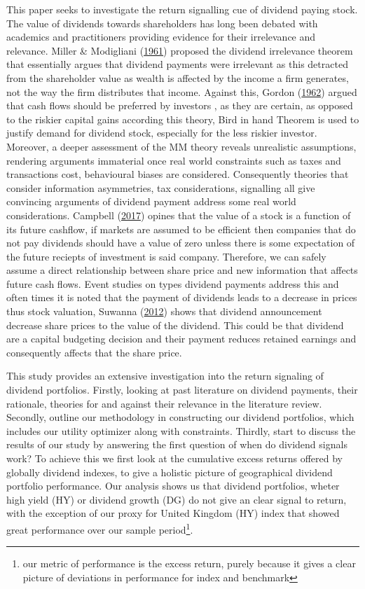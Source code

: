\documentclass[10pt,preprint, authoryear]{elsarticle}
\numberwithin{equation}{section}
\numberwithin{figure}{section}
\numberwithin{table}{section}
\let\rmarkdownfootnote\footnote%
\def\footnote{\protect\rmarkdownfootnote}
\begin{document}
This paper seeks to investigate the return signalling cue of dividend
paying stock. The value of dividends towards shareholders has long been
debated with academics and practitioners providing evidence for their
irrelevance and relevance. Miller \& Modigliani
(\protect\hyperlink{ref-miller}{1961}) proposed the dividend irrelevance
theorem that essentially argues that dividend payments were irrelevant
as this detracted from the shareholder value as wealth is affected by
the income a firm generates, not the way the firm distributes that
income. Against this, Gordon (\protect\hyperlink{ref-gordon1962}{1962})
argued that cash flows should be preferred by investors , as they are
certain, as opposed to the riskier capital gains according this theory,
Bird in hand Theorem is used to justify demand for dividend stock,
especially for the less riskier investor. Moreover, a deeper assessment
of the MM theory reveals unrealistic assumptions, rendering arguments
immaterial once real world constraints such as taxes and transactions
cost, behavioural biases are considered. Consequently theories that
consider information asymmetries, tax considerations, signalling all
give convincing arguments of dividend payment address some real world
considerations. Campbell
(\protect\hyperlink{ref-campbell2017financial}{2017}) opines that the
value of a stock is a function of its future cashflow, if markets are
assumed to be efficient then companies that do not pay dividends should
have a value of zero unless there is some expectation of the future
reciepts of investment is said company. Therefore, we can safely assume
a direct relationship between share price and new information that
affects future cash flows. Event studies on types dividend payments
address this and often times it is noted that the payment of dividends
leads to a decrease in prices thus stock valuation, Suwanna
(\protect\hyperlink{ref-suwanna2012impacts}{2012}) shows that dividend
announcement decrease share prices to the value of the dividend. This
could be that dividend are a capital budgeting decision and their
payment reduces retained earnings and consequently affects that the
share price.

This study provides an extensive investigation into the return signaling
of dividend portfolios. Firstly, looking at past literature on dividend
payments, their rationale, theories for and against their relevance in
the literature review. Secondly, outline our methodology in constructing
our dividend portfolios, which includes our utility optimizer along with
constraints. Thirdly, start to discuss the results of our study by
answering the first question of when do dividend signals work? To
achieve this we first look at the cumulative excess returns offered by
globally dividend indexes, to give a holistic picture of geographical
dividend portfolio performance. Our analysis shows us that dividend
portfolios, wheter high yield (HY) or dividend growth (DG) do not give
an clear signal to return, with the exception of our proxy for United
Kingdom (HY) index that showed great performance over our sample
period\footnote{our metric of performance is the excess return, purely
  because it gives a clear picture of deviations in performance for
  index and benchmark}.
\end{document}
